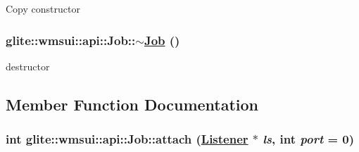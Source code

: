 Copy constructor \hypertarget{classglite_1_1wmsui_1_1api_1_1Job_z15_4}{
\subsubsection[$\sim$Job]{\setlength{\rightskip}{0pt plus 5cm}glite::wmsui::api::Job::$\sim$\hyperlink{classglite_1_1wmsui_1_1api_1_1Job}{Job} ()}}
\label{classglite_1_1wmsui_1_1api_1_1Job_z15_4}


destructor 

\subsection{Member Function Documentation}
\hypertarget{classglite_1_1wmsui_1_1api_1_1Job_z19_1}{
\subsubsection[attach]{\setlength{\rightskip}{0pt plus 5cm}int glite::wmsui::api::Job::attach (\hyperlink{classglite_1_1wmsui_1_1api_1_1Listener}{Listener} $\ast$ {\em ls}, int {\em port} = 0)}}
\label{classglite_1_1wmsui_1_1api_1_1Job_z19_1}


